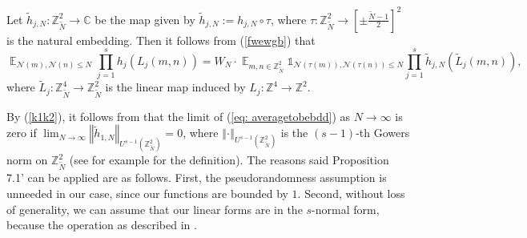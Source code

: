 \documentclass[11pt]{amsart}
\theoremstyle{definition}
\DeclareMathOperator*{\E}{\mathbb{E}}
\newcommand{\C}{{\mathbb C}}
\newcommand{\NN}{{\mathcal N}}
\newcommand{\R}{{\mathbb R}}
\newcommand{\Z}{{\mathbb Z}}
\newcommand{\norm}[1]{\left\Vert #1\right\Vert}
\begin{document}


Let $\tilde{h}_{j,N}\colon \Z_{\tilde{N}}^{2}\to\C$ be the map given by $\tilde{h}_{j,N}:=h_{j,N}\circ\tau$, where $\tau\colon \Z_{\tilde{N}}^{2}\to \left[\pm\frac{\tilde{N}-1}{2}\right]^{2}$ is the natural embedding.
Then it follows from
 (\ref{fwewgb}) that
    \begin{equation}\label{eq: averagetobebdd}
    \E_{\NN(m),\NN(n) \leq  N} \prod_{j=1}^s h_j(L_j(m,n))=W_{N}\cdot\E_{m,n \in  \Z_{\tilde{N}}^{2}} \mathds{1}_{\NN(\tau(m)),\NN(\tau(n))\leq N}\prod_{j=1}^s \tilde{h}_{j,N}(\tilde{L}_j(m,n)),
    \end{equation}
    where $\tilde{L}_{j}\colon \Z_{\tilde{N}}^{4}\to \Z_{\tilde{N}}^{2}$ is the linear map induced by $L_{j}\colon \Z^{4}\to\Z^{2}$.

    
 By (\ref{k1k2}), it follows from \cite[Proposition 7.1$'$]{GT10b} that the limit of (\ref{eq: averagetobebdd}) as $N\to\infty$ is zero if $\lim_{N\to\infty}\norm{\tilde{h}_{1,N}}_{U^{s-1}(\Z_{\tilde{N}}^{2})}=0$, where $\norm{\cdot}_{U^{s-1}(\Z_{\tilde{N}}^{2})}$ is the $(s-1)$-th Gowers norm on $\Z_{\tilde{N}}^{2}$ (see for example \cite[Definition B.1]{GT10b} for the definition). 
    The reasons said Proposition 7.1' can be applied are as follows. First, the pseudorandomness assumption is unneeded in our case, since our functions are bounded by $1$. Second, without loss of generality, we can assume that our linear forms are in the $s$-normal form, because the operation as described in \cite[Lemma~4.4]{GT10b}.
    
\end{document}
